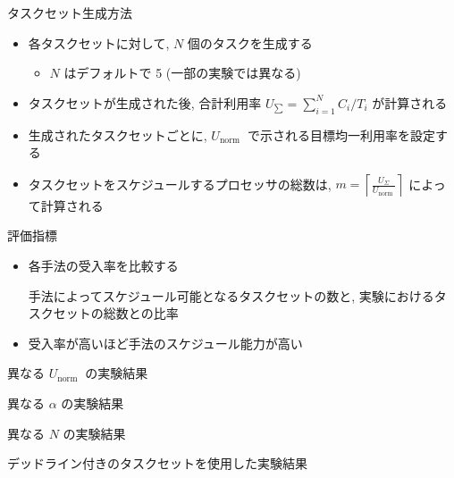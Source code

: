 \begin{frame}{タスクセット生成方法}
    \begin{itemize}
        \item 各タスクセットに対して, $N$ 個のタスクを生成する
              \begin{itemize}
                  \item $N$ はデフォルトで 5  (一部の実験では異なる)
              \end{itemize}
        \item タスクセットが生成された後, 合計利用率 $U_{\sum}=\sum_{i=1}^{N} C_{i} / T_{i}$ が計算される
        \item 生成されたタスクセットごとに, $U_{\text {norm }}$ で示される目標均一利用率を設定する
        \item タスクセットをスケジュールするプロセッサの総数は, $m=\left\lceil\frac{U_{\Sigma}}{U_{\text {norm }}}\right\rceil$ によって計算される
    \end{itemize}
\end{frame}

\begin{frame}{評価指標}
    \begin{itemize}
        \item 各手法の受入率を比較する
              \begin{definition}[受入率]
                  手法によってスケジュール可能となるタスクセットの数と, 実験におけるタスクセットの総数との比率
              \end{definition}
        \item 受入率が高いほど手法のスケジュール能力が高い
    \end{itemize}
\end{frame}

\begin{frame}{異なる $U_{\text {norm }}$ の実験結果}
\end{frame}

\begin{frame}{異なる $\alpha$ の実験結果}
\end{frame}

\begin{frame}{異なる $N$ の実験結果}
\end{frame}

\begin{frame}{デッドライン付きのタスクセットを使用した実験結果}
\end{frame}

